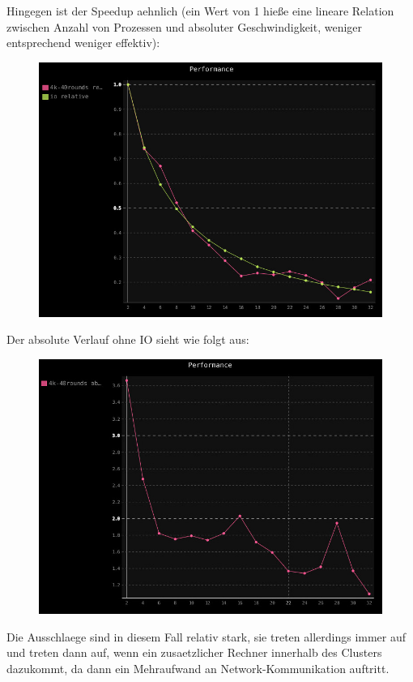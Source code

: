 Hingegen ist der Speedup aehnlich (ein Wert von 1 hieße eine lineare
Relation zwischen Anzahl von Prozessen und absoluter Geschwindigkeit,
weniger entsprechend weniger effektiv):

\begin{figure}[htbp]
\centering
\includegraphics{pics/io-vs-no-io rel.jpg}
\end{figure}

Der absolute Verlauf ohne IO sieht wie folgt aus:

\begin{figure}[htbp]
\centering
\includegraphics{pics/perf-abs.jpg}
\end{figure}

Die Ausschlaege sind in diesem Fall relativ stark, sie treten allerdings
immer auf und treten dann auf, wenn ein zusaetzlicher Rechner innerhalb
des Clusters dazukommt, da dann ein Mehraufwand an Network-Kommunikation
auftritt.

